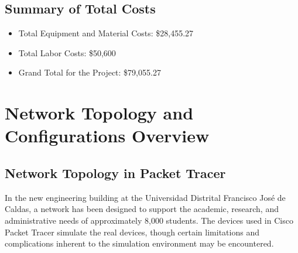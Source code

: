 \documentclass[12pt]{article}
\begin{document}



\subsection{Summary of Total Costs}

\begin{itemize}
    \item Total Equipment and Material Costs: \$28,455.27
    \item Total Labor Costs: \$50,600
    \item Grand Total for the Project: \$79,055.27
\end{itemize}

\section{Network Topology and Configurations Overview}

\subsection{Network Topology in Packet Tracer}

In the new engineering building at the Universidad Distrital Francisco José de Caldas, a network has been designed to support the academic, research, and administrative needs of approximately 8,000 students. The devices used in Cisco Packet Tracer simulate the real devices, though certain limitations and complications inherent to the simulation environment may be encountered.
\end{document}
